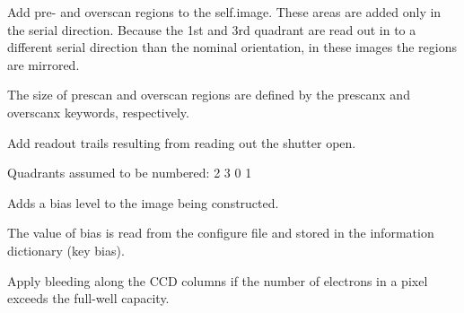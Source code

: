 \documentclass[a4paper,11pt,english]{sphinxmanual}
\begin{document}
\begin{fulllineitems}
\begin{fulllineitems}
\end{fulllineitems}


\begin{fulllineitems}
\label{simulator:simulator.simulator.VISsimulator.addPreOverScans}
Add pre- and overscan regions to the self.image. These areas are added only in the serial direction.
Because the 1st and 3rd quadrant are read out in to a different serial direction than the nominal
orientation, in these images the regions are mirrored.

The size of prescan and overscan regions are defined by the prescanx and overscanx keywords, respectively.

\end{fulllineitems}


\begin{fulllineitems}
\label{simulator:simulator.simulator.VISsimulator.addReadoutTrails}
Add readout trails resulting from reading out the shutter open.

Quadrants assumed to be numbered:
2 3
0 1

\end{fulllineitems}


\begin{fulllineitems}
\label{simulator:simulator.simulator.VISsimulator.applyBias}
Adds a bias level to the image being constructed.

The value of bias is read from the configure file and stored
in the information dictionary (key bias).

\end{fulllineitems}


\begin{fulllineitems}
\label{simulator:simulator.simulator.VISsimulator.applyBleeding}
Apply bleeding along the CCD columns if the number of electrons in a pixel exceeds the full-well capacity.


\end{fulllineitems}
\end{fulllineitems}
\end{document}
